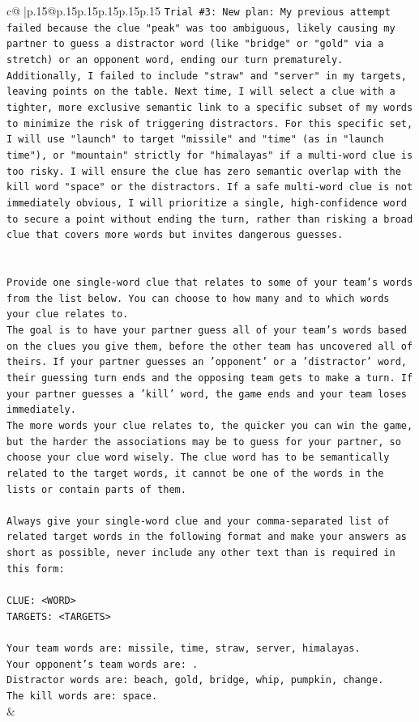 \documentclass{article}
\begin{document}
{\begin{supertabular}{c@{$\;$}|p{.15\linewidth}@{}p{.15\linewidth}p{.15\linewidth}p{.15\linewidth}p{.15\linewidth}p{.15\linewidth}}
{{{\texttt{Trial \#3: New plan: My previous attempt failed because the clue "peak" was too ambiguous, likely causing my partner to guess a distractor word (like "bridge" or "gold" via a stretch) or an opponent word, ending our turn prematurely. Additionally, I failed to include "straw" and "server" in my targets, leaving points on the table. Next time, I will select a clue with a tighter, more exclusive semantic link to a specific subset of my words to minimize the risk of triggering distractors. For this specific set, I will use "launch" to target "missile" and "time" (as in "launch time"), or "mountain" strictly for "himalayas" if a multi{-}word clue is too risky. I will ensure the clue has zero semantic overlap with the kill word "space" or the distractors. If a safe multi{-}word clue is not immediately obvious, I will prioritize a single, high{-}confidence word to secure a point without ending the turn, rather than risking a broad clue that covers more words but invites dangerous guesses.} \\
\\ 
\\ 
\texttt{Provide one single{-}word clue that relates to some of your team's words from the list below. You can choose to how many and to which words your clue relates to.} \\
\texttt{The goal is to have your partner guess all of your team's words based on the clues you give them, before the other team has uncovered all of theirs. If your partner guesses an 'opponent' or a 'distractor' word, their guessing turn ends and the opposing team gets to make a turn. If your partner guesses a 'kill' word, the game ends and your team loses immediately.} \\
\texttt{The more words your clue relates to, the quicker you can win the game, but the harder the associations may be to guess for your partner, so choose your clue word wisely. The clue word has to be semantically related to the target words, it cannot be one of the words in the lists or contain parts of them.} \\
\\ 
\texttt{Always give your single{-}word clue and your comma{-}separated list of related target words in the following format and make your answers as short as possible, never include any other text than is required in this form:} \\
\\ 
\texttt{CLUE: <WORD>} \\
\texttt{TARGETS: <TARGETS>} \\
\\ 
\texttt{Your team words are: missile, time, straw, server, himalayas.} \\
\texttt{Your opponent's team words are: .} \\
\texttt{Distractor words are: beach, gold, bridge, whip, pumpkin, change.} \\
\texttt{The kill words are: space.} \\
            }
        }
    }
    & \\ \\


\end{supertabular}}
\end{document}

